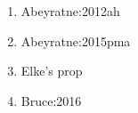 \begin{enumerate}
	\item \cite{Abeyratne:2012ah} Abeyratne:2012ah
	\item \cite{Abeyratne:2015pma} Abeyratne:2015pma
	\item \cite{Aschenauer:2016} Elke's prop
	\item \cite{Bruce:2016} Bruce:2016
\end{enumerate}